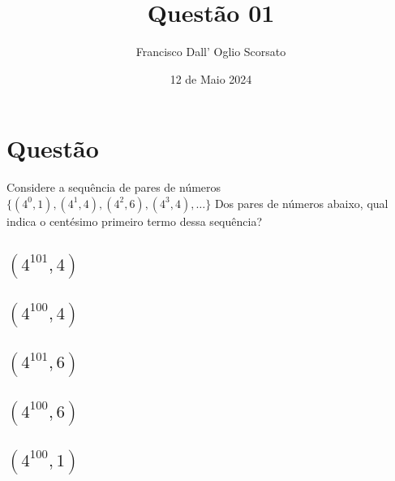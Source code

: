 \documentclass{article}
\title{Questão 01}
\author{Francisco Dall' Oglio Scorsato}
\date{12 de Maio 2024}
\begin{document}
\maketitle

\section{Questão}
Considere a sequência de pares de números \(\{(4^0,1),(4^1,4),(4^2,6),(4^3,4),\dots\}\)
Dos pares de números abaixo, qual indica o centésimo primeiro termo dessa sequência?
\subsection{\((4^{101},4)\)}
\subsection{\((4^{100},4)\)}
\subsection{\((4^{101},6)\)}
\subsection{\((4^{100},6)\)}
\subsection{\((4^{100},1)\)}
\end{document}

